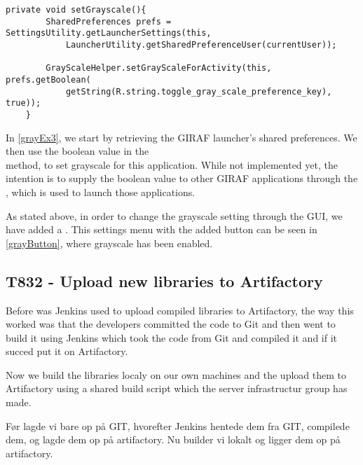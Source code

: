 \begin{minipage}[H]{\linewidth}
\begin{lstlisting}[caption = Setting grayscale by calling the setGrayScaleForActivity method, label = grayEx3] 
private void setGrayscale(){
        SharedPreferences prefs = SettingsUtility.getLauncherSettings(this,
            LauncherUtility.getSharedPreferenceUser(currentUser));

        GrayScaleHelper.setGrayScaleForActivity(this, prefs.getBoolean(
            getString(R.string.toggle_gray_scale_preference_key), true));
    }
\end{lstlisting}
\end{minipage}

In \autoref{grayEx3}, we start by retrieving the GIRAF launcher's shared
preferences. We then use the boolean
 value in the \\
 method, to set grayscale for this
application. While not implemented yet, the intention is to supply the boolean
value to other GIRAF applications through the , which is
used to launch those applications.\nl

As stated above, in order to change the grayscale setting through the GUI, we
have added a . This settings menu with the added button can
be seen in \autoref{grayButton}, where grayscale has been enabled. 



\subsection{T832 - Upload new libraries to Artifactory}

Before was Jenkins used to upload compiled libraries to Artifactory, the way
this worked was that the developers committed the code to Git and then went to
build it using Jenkins which took the code from Git and compiled it and if it
succed put it on Artifactory. \nl 

Now we build the libraries localy on our own machines and the upload them to
Artifactory using a shared build script which the server infrastructur group has
made.

Før lagde vi bare op på GIT, hvorefter Jenkins hentede dem fra GIT, compilede
dem, og lagde dem op på artifactory. Nu builder vi lokalt og ligger dem op på artifactory.\nl


